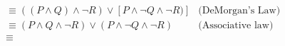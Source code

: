 
\begin{align*}
  &\equiv ((P \land Q) \land \lnot R) \lor [P \land \lnot Q \land \lnot R)]
    &\textrm{(DeMorgan's Law)}\\
  &\equiv (P \land Q \land \lnot R) \lor (P \land \lnot Q \land \lnot R)
    &\textrm{(Associative law)}\\
  &\equiv 
\end{align*}
